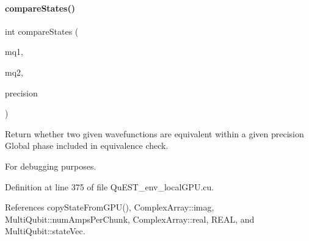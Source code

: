 \paragraph{\texorpdfstring{compare\+States()}{compareStates()}}
{\footnotesize\ttfamily int compare\+States (\begin{DoxyParamCaption}\item[{\mbox{\hyperlink{structMultiQubit}{Multi\+Qubit}}}]{mq1,  }\item[{\mbox{\hyperlink{structMultiQubit}{Multi\+Qubit}}}]{mq2,  }\item[{\mbox{\hyperlink{QuEST__precision_8h_a4b654506f18b8bfd61ad2a29a7e38c25}{R\+E\+AL}}}]{precision }\end{DoxyParamCaption})}



Return whether two given wavefunctions are equivalent within a given precision Global phase included in equivalence check. 

For debugging purposes. 

Definition at line 375 of file Qu\+E\+S\+T\+\_\+env\+\_\+local\+G\+P\+U.\+cu.



References copy\+State\+From\+G\+P\+U(), Complex\+Array\+::imag, Multi\+Qubit\+::num\+Amps\+Per\+Chunk, Complex\+Array\+::real, R\+E\+AL, and Multi\+Qubit\+::state\+Vec.


